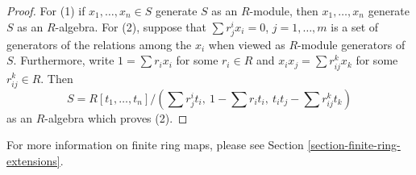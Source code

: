 \begin{proof}
For (1) if $x_1, \ldots, x_n \in S$ generate $S$ as an $R$-module,
then $x_1, \ldots, x_n$ generate $S$ as an $R$-algebra. For (2),
suppose that $\sum r_j^ix_i = 0$, $j = 1, \ldots, m$ is a set
of generators of the relations among the $x_i$ when viewed as
$R$-module generators of $S$. Furthermore, write
$1 = \sum r_ix_i$ for some $r_i \in R$ and
$x_ix_j = \sum r_{ij}^k x_k$ for some $r_{ij}^k \in R$.
Then
$$
S = R[t_1, \ldots, t_n]/
(\sum r_j^it_i,\ 1 - \sum r_it_i,\ t_it_j - \sum r_{ij}^k t_k)
$$
as an $R$-algebra which proves (2).
\end{proof}

\noindent
For more information on finite ring maps, please see
Section \ref{section-finite-ring-extensions}.


